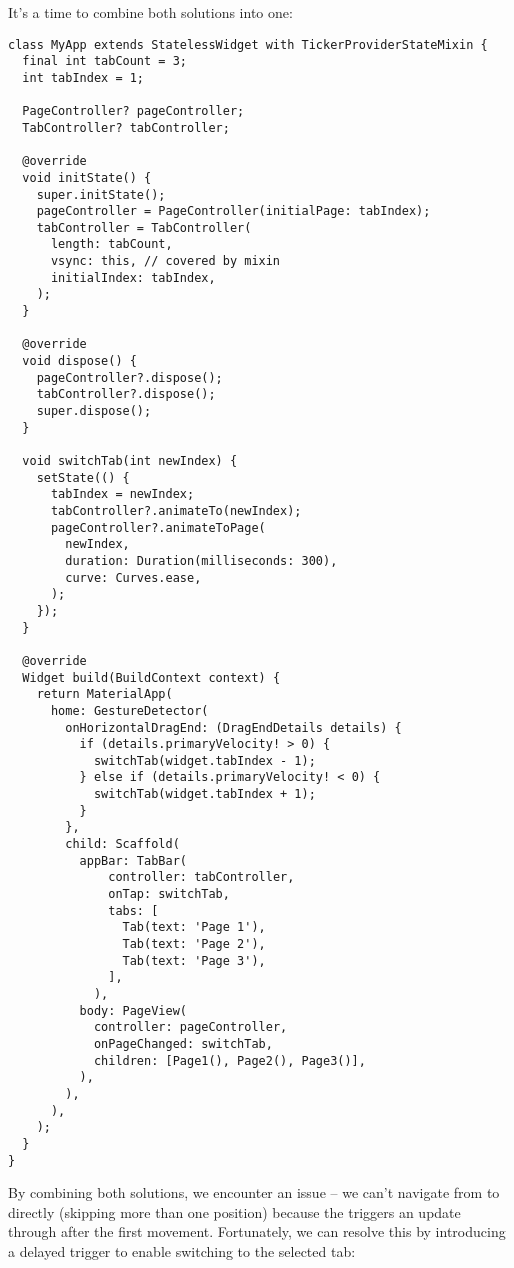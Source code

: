\noindent It's a time to combine both solutions into one:

\begin{lstlisting}
class MyApp extends StatelessWidget with TickerProviderStateMixin {
  final int tabCount = 3;
  int tabIndex = 1;

  PageController? pageController;
  TabController? tabController;

  @override
  void initState() {
    super.initState();
    pageController = PageController(initialPage: tabIndex);
    tabController = TabController(
      length: tabCount,
      vsync: this, // covered by mixin
      initialIndex: tabIndex,
    );
  }

  @override
  void dispose() {
    pageController?.dispose();
    tabController?.dispose();
    super.dispose();
  }

  void switchTab(int newIndex) {
    setState(() {
      tabIndex = newIndex;
      tabController?.animateTo(newIndex);
      pageController?.animateToPage(
        newIndex,
        duration: Duration(milliseconds: 300),
        curve: Curves.ease,
      );
    });
  }

  @override
  Widget build(BuildContext context) {
    return MaterialApp(
      home: GestureDetector(
        onHorizontalDragEnd: (DragEndDetails details) {
          if (details.primaryVelocity! > 0) {
            switchTab(widget.tabIndex - 1);
          } else if (details.primaryVelocity! < 0) {
            switchTab(widget.tabIndex + 1);
          }
        },
        child: Scaffold(
          appBar: TabBar(
              controller: tabController,
              onTap: switchTab,
              tabs: [
                Tab(text: 'Page 1'),
                Tab(text: 'Page 2'),
                Tab(text: 'Page 3'),
              ],
            ),
          body: PageView(
            controller: pageController,
            onPageChanged: switchTab,
            children: [Page1(), Page2(), Page3()],
          ),
        ),
      ),
    );
  }
}
\end{lstlisting}

\noindent By combining both solutions, we encounter an issue -- we can't navigate from  to  directly 
(skipping more than one position) because the  triggers an update through  after the 
first movement. Fortunately, we can resolve this by introducing a delayed trigger to enable switching to the selected 
tab:

